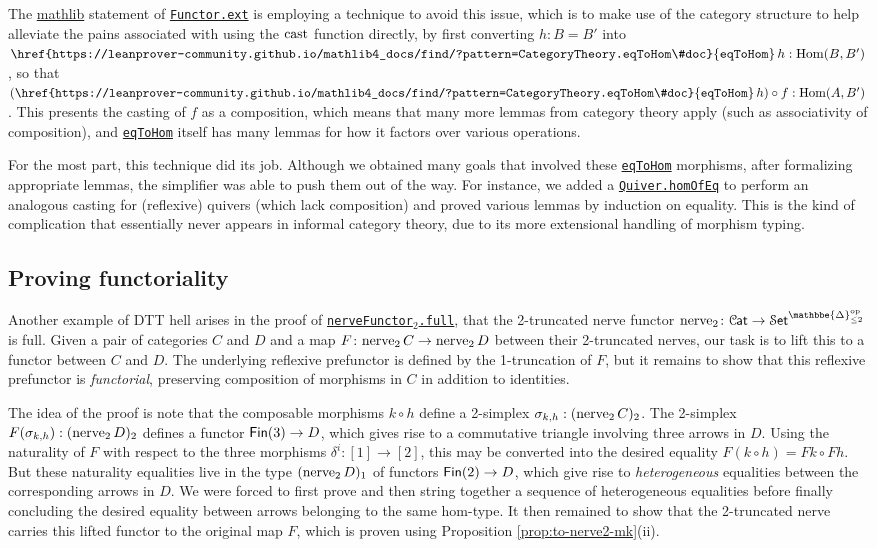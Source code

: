 \documentclass[a4paper,UKenglish,cleveref, autoref, thm-restate]{lipics-v2021}
\newcommand{\op}{\textup{op}}
\newcommand{\nerve}{\textup{nerve}}
\newcommand{\cast}{\textup{cast}}
\newcommand{\Hom}{\textup{Hom}}
\newcommand{\cat}[1]{\textup{\textsf{#1}}}%
\newcommand{\1}{\mathbbe{1}}
\newcommand{\2}{\mathbbe{2}}
\newcommand{\3}{\mathbbe{3}}
\newcommand{\DDelta}{\mathbbe{\Delta}}
\newcommand{\Fin}{\cat{Fin}}
\newcommand{\Cat}{\mathcal{C}{\kern-.75pt}\cat{at}}
\newcommand{\Set}{\mathcal{S}\cat{et}}
\newcommand{\libmathlib}{\href{https://github.com/leanprover-community/mathlib}{\textsf{mathlib}}}
\newcommand{\ldoc}[2][]{\href{https://leanprover-community.github.io/mathlib4_docs/find/?pattern=#1#2\#doc}{\texttt{#2}}}
\newcommand{\cdoc}[2][]{\href{https://leanprover-community.github.io/mathlib4_docs/find/?pattern=CategoryTheory.#1#2\#doc}{\texttt{#2}}}
\newcommand{\cdocTwo}[3][]{\href{https://leanprover-community.github.io/mathlib4_docs/find/?pattern=CategoryTheory.#1#2\%E2\%82\%82#3\#doc}{\texttt{#2${}_2$#3}}}
\begin{document}
The \libmathlib{} statement of \cdoc{Functor.ext} is employing a technique to avoid this issue, which is to make use of the category structure to help alleviate the pains associated with using the $\cast$ function directly, by first converting $h:B=B'$ into $\cdoc{eqToHom}\,h:\Hom(B,B')$, so that $(\cdoc{eqToHom}\,h) \circ f:\Hom(A,B')$. This presents the casting of $f$ as a composition, which means that many more lemmas from category theory apply (such as associativity of composition), and \cdoc{eqToHom} itself has many lemmas for how it factors over various operations.

For the most part, this technique did its job. Although we obtained many goals that involved these \cdoc{eqToHom} morphisms, after formalizing appropriate lemmas, the simplifier was able to push them out of the way. For instance, we added a \ldoc{Quiver.homOfEq} to perform an analogous casting for (reflexive) quivers (which lack composition) and proved various lemmas by induction on equality. This is the kind of complication that essentially never appears in informal category theory, due to its more extensional handling of morphism typing.


\subsection{Proving functoriality}\label{sec:full}

Another example of DTT hell arises in the proof of \cdocTwo{nerveFunctor}{.full}, that the 2-truncated nerve functor $\nerve_2\colon \Cat \to \Set^{\DDelta_{\leq 2}^\op}$ is full. Given a pair of categories $C$ and $D$ and a map $F \colon \nerve_2\, C \to \nerve_2\, D$ between their 2-truncated nerves, our task is to lift this to a functor between $C$ and $D$. The underlying reflexive prefunctor is defined by the 1-truncation of $F$, but it remains to show that this reflexive prefunctor is \emph{functorial}, preserving composition of morphisms in $C$ in addition to identities.

The idea of the proof is note that the composable morphisms $k \circ h$ define a 2-simplex $\sigma_{k,h} : (\nerve_2\,C)_2$. The 2-simplex $F(\sigma_{k,h}) : (\nerve_2\,D)_2$ defines a functor $\Fin(3) \to D$, which gives rise to a commutative triangle involving three arrows in $D$. Using the naturality of $F$ with respect to the three morphisms $\delta^i \colon [1] \to [2]$, this may be converted into the desired equality $F(k \circ h) = Fk \circ Fh$. But these naturality equalities live in the type $(\nerve_2\,D)_1$ of functors $\Fin(2) \to D$, which give rise to \emph{heterogeneous} equalities between the corresponding arrows in $D$. We were forced to first prove and then string together a sequence of heterogeneous equalities before finally concluding the desired equality between arrows belonging to the same hom-type. It then remained to show that the 2-truncated nerve carries this lifted functor to the original map $F$, which is proven using Proposition \ref{prop:to-nerve2-mk}(ii).
\end{document}
